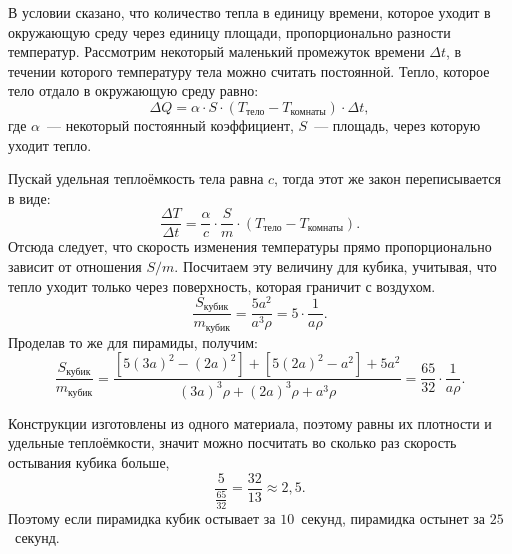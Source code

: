 \par В условии сказано, что количество тепла в единицу времени, которое уходит в окружающую среду через единицу площади, пропорционально разности температур. Рассмотрим некоторый маленький промежуток времени $\Delta t$, в течении которого температуру тела можно считать постоянной. Тепло, которое тело отдало в окружающую среду равно:
\begin{equation}
	\Delta Q = \alpha \cdot S \cdot (T_\text{тело} - T_\text{комнаты}) \cdot \Delta t ,
\end{equation}
где $\alpha$~--- некоторый постоянный коэффициент, $S$~--- площадь, через которую уходит тепло.
\par  Пускай удельная теплоёмкость тела равна $c$, тогда этот же закон переписывается в виде:
\begin{equation}
	\frac{\Delta T}{\Delta t} = \frac{\alpha}{c}  \cdot \frac{S}{m} \cdot (T_\text{тело} - T_\text{комнаты}).
\end{equation}
Отсюда следует, что скорость изменения температуры прямо пропорционально зависит от отношения $S/m$. Посчитаем эту величину для кубика, учитывая, что тепло уходит только через поверхность, которая граничит с воздухом.
\begin{equation}
	\frac{S_\text{кубик}}{m_\text{кубик}} = \frac{5 a^2}{a^3\rho} = 5\cdot \frac{1}{a\rho}.
\end{equation}
Проделав то же для пирамиды, получим:
\begin{equation}
	\frac{S_\text{кубик}}{m_\text{кубик}}
	=
	\frac{\left[5 (3a)^{2} - (2a)^2 \right] 
		 + \left[5 (2a)^2 - a^2\right]
		  + 5a^2 }
		 {(3a)^3\rho + (2a)^3\rho + a^3 \rho} = \frac{65}{32} \cdot \frac{1}{a\rho}.
\end{equation}
\par Конструкции изготовлены из одного материала, поэтому равны их плотности и удельные теплоёмкости, значит можно посчитать во сколько раз скорость остывания кубика больше,
\begin{equation}
	\frac{ 5 }{\frac{65}{32}} = \frac{32}{13} \approx 2{,}5.
\end{equation}
Поэтому если пирамидка кубик остывает за $10$~секунд, пирамидка остынет за $25$~секунд.


